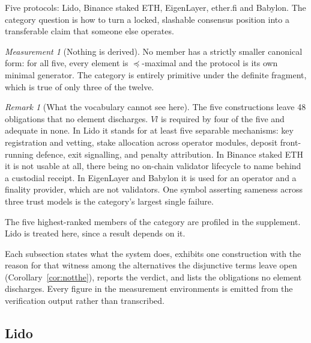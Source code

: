 \documentclass[11pt,reqno]{amsart}
\theoremstyle{plain}
\theoremstyle{definition}
\theoremstyle{remark}
\newtheorem{measurement}[theorem]{Measurement}
\newtheorem{remark}[theorem]{Remark}
\begin{document}
Five protocols: Lido, Binance staked ETH, EigenLayer, ether.fi and Babylon. The
category question is how to turn a locked, slashable consensus position into a
transferable claim that someone else operates.

\begin{measurement}[Nothing is derived]\label{meas:cat:lsdex}
No member has a strictly smaller canonical form: for all five, every element is
$\preceq$-maximal and the protocol is its own minimal generator. The category is
entirely primitive under the definite fragment, which is true of only three of
the twelve.
\end{measurement}

\begin{remark}[What the vocabulary cannot see here]
The five constructions leave 48 obligations that no element discharges. $Vl$ is
required by four of the five and adequate in none. In Lido it stands for at
least five separable mechanisms: key registration and vetting, stake allocation
across operator modules, deposit front-running defence, exit signalling, and
penalty attribution. In Binance staked ETH it is not usable at all, there being
no on-chain validator lifecycle to name behind a custodial receipt. In
EigenLayer and Babylon it is used for an operator and a finality provider, which
are not validators. One symbol asserting sameness across three trust models is
the category's largest single failure.
\end{remark}

The five highest-ranked members of the category are profiled in the
supplement. Lido is treated here, since a result depends on it.

Each
subsection states what the system does, exhibits one construction with the
reason for that witness among the alternatives the disjunctive terms leave open
(Corollary~\ref{cor:notthe}), reports the verdict, and lists the obligations no
element discharges. Every figure in the measurement environments is emitted from
the verification output rather than transcribed.

\subsection{Lido}\label{case:lsd:lido}
\end{document}
